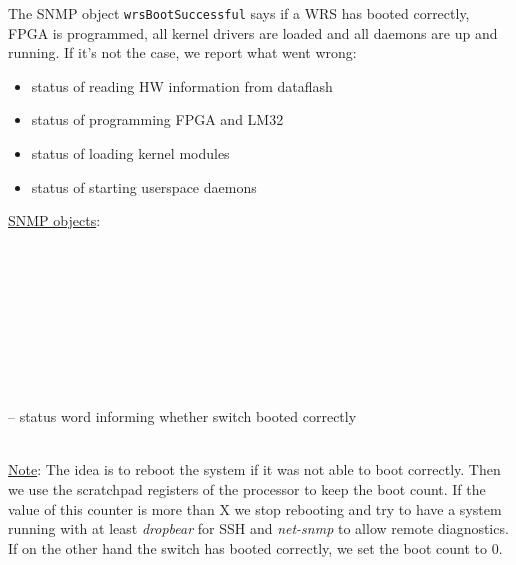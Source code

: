 \begin{pck_descr}
				The SNMP object \texttt{wrsBootSuccessful} says if a WRS has booted
				correctly, FPGA is programmed, all kernel drivers are loaded and all
				daemons are up and running. If it's not the case, we report what went
				wrong:
				\begin{itemize}
					\item status of reading HW information from dataflash
					\item status of programming FPGA and LM32
					\item status of loading kernel modules
					\item status of starting userspace daemons
				\end{itemize}
			\item [] \underline{SNMP objects}:\\
				\\
				\\
				\\
				\\
				\\
				\\
				\\
				\\
				\\
				 -- status word informing whether switch booted correctly\\
				\\
			\item [] \underline{Note}: 
				The idea is to reboot the system if it was not able to boot correctly.
				Then we use the scratchpad registers of the processor to keep
				the boot count. If the value of this counter is more than X we stop
				rebooting and try to have a system running with at least \emph{dropbear}
				for SSH and \emph{net-snmp} to allow remote diagnostics. If on the other
				hand the switch has booted correctly, we set the boot count to 0.
		\end{pck_descr}

